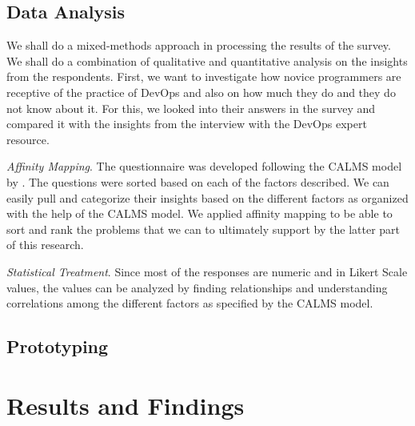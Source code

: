 \documentclass{sigchi}
\begin{document}
\subsection{Data Analysis}
We shall do a mixed-methods approach in processing the results of the survey. We shall do a combination of qualitative and quantitative analysis on the insights from the respondents. First, we want to investigate how novice programmers are receptive of the practice of DevOps and also on how much they do and they do not know about it. For this, we looked into their answers in the survey and compared it with the insights from the interview with the DevOps expert resource. 

\textit{Affinity Mapping}. The questionnaire was developed following the CALMS model by \cite{riley2014keep}. The questions were sorted based on each of the factors described. We can easily pull and categorize their insights based on the different factors as organized with the help of the CALMS model. We applied affinity mapping to be able to sort and rank the problems that we can to ultimately support by the latter part of this research. 

\textit{Statistical Treatment}. Since most of the responses are numeric and in Likert Scale values, the values can be analyzed by finding relationships and understanding correlations among the different factors as specified by the CALMS model. 
\subsection{Prototyping}

\section{Results and Findings}
\end{document}
